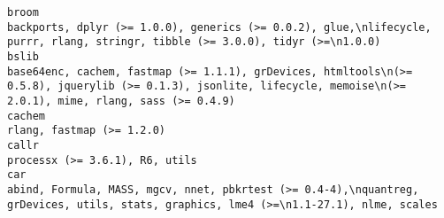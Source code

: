 \documentclass[
  letterpaper,
  DIV=11,
  numbers=noendperiod]{scrreprt}
\begin{document}
\begin{verbatim}
broom                                                                                                                                                                                                                                                                                                                                                                                                                                                                                      backports, dplyr (>= 1.0.0), generics (>= 0.0.2), glue,\nlifecycle, purrr, rlang, stringr, tibble (>= 3.0.0), tidyr (>=\n1.0.0)
bslib                                                                                                                                                                                                                                                                                                                                                                                                                                                base64enc, cachem, fastmap (>= 1.1.1), grDevices, htmltools\n(>= 0.5.8), jquerylib (>= 0.1.3), jsonlite, lifecycle, memoise\n(>= 2.0.1), mime, rlang, sass (>= 0.4.9)
cachem                                                                                                                                                                                                                                                                                                                                                                                                                                                                                                                                                                                           rlang, fastmap (>= 1.2.0)
callr                                                                                                                                                                                                                                                                                                                                                                                                                                                                                                                                                                                       processx (>= 3.6.1), R6, utils
car                                                                                                                                                                                                                                                                                                                                                                                                                                                                                 abind, Formula, MASS, mgcv, nnet, pbkrtest (>= 0.4-4),\nquantreg, grDevices, utils, stats, graphics, lme4 (>=\n1.1-27.1), nlme, scales

\end{verbatim}
\end{document}

